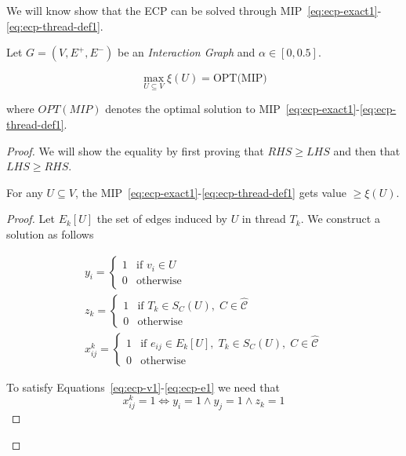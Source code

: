 We will know show that the \acrshort{ECP} can be solved through
MIP~\ref{eq:ecp-exact1}-\ref{eq:ecp-thread-def1}.

\begin{theorem}
	\label{th:ecp-mip}
	Let $G = (V, E^{+}, E^{-})$ be an \emph{Interaction Graph} and $\alpha \in
		[0, 0.5]$.

	\begin{equation}
		\max_{U \subseteq V} \xi(U) = \text{OPT(MIP)}
	\end{equation}

	where $OPT(MIP)$ denotes the optimal solution to
	MIP~\ref{eq:ecp-exact1}-\ref{eq:ecp-thread-def1}.
\end{theorem}

\begin{proof}
	We will show the equality by first proving that $RHS \geq LHS$ and then
	that $LHS \geq RHS$.

	\begin{claim}
		For any $U \subseteq V$, the
		MIP~\ref{eq:ecp-exact1}-\ref{eq:ecp-thread-def1} gets value $\geq \xi(U)$.
	\end{claim}

	\begin{proof}
		Let $E_k[U]$ the set of edges induced by $U$ in thread $T_k$. We construct a solution as follows

		\begin{gather}
			\label{eq:ecpp-y}
			y_i = \begin{cases}
				1 & \text{if } v_{i} \in U \\
				0 & \text{otherwise}
			\end{cases} \\
			\label{eq:ecpp-z}
			z_k = \begin{cases}
				1 & \text{if } T_{k} \in S_{C}(U), \; C \in \mathcal{\hat{C}} \\
				0 & \text{otherwise}
			\end{cases} \\
			\label{eq:ecpp-x}
			x_{ij}^{k} = \begin{cases}
				1 & \text{if } e_{ij} \in E_{k}[U], \; T_{k} \in S_C(U), \; C \in
				\mathcal{\hat{C}}                                                 \\
				0 & \text{otherwise}
			\end{cases}
		\end{gather}

		To satisfy Equations~\ref{eq:ecp-v1}-\ref{eq:ecp-e1} we need that
		\begin{equation}
			\label{eq:ecpp-x-iff}
			x_{ij}^{k} = 1 \iff y_i = 1 \land y_j = 1 \land z_k = 1
		\end{equation}


\end{proof}
\end{proof}
